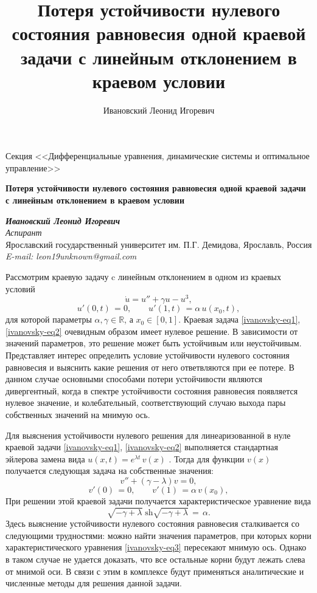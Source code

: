 \documentclass[a4paper, 12pt, oneside]{ncc}
\title{ Потеря устойчивости нулевого состояния равновесия одной краевой задачи с линейным отклонением в краевом условии }
\author{ Ивановский Леонид Игоревич }
\begin{document}
\begin{flushright}
Секция <<Дифференциальные уравнения, динамические системы и оптимальное управление>>
\end{flushright}

\begin{center}
\textbf{Потеря устойчивости нулевого состояния равновесия одной краевой задачи с линейным отклонением в краевом условии}
\end{center}


\begin{center}
\textbf{\textit{Ивановский Леонид Игоревич}}\\
\textit{Аспирант}\\
Ярославский государственный университет им. П.Г. Демидова, Ярославль, Россия\\
\textit{E-mail: leon19unknown@gmail.com}
\\
\end{center}


Рассмотрим краевую задачу c линейным отклонением в одном из краевых условий
\begin{equation}\label{ivanovsky-eq1}
	\dot u = u'' + \gamma u - u^3,	
\end{equation}
\begin{equation}\label{ivanovsky-eq2}	
	u'(0, t) \, = 0, \qquad u'(1, t) \, = \alpha\,u(x_0, t),
\end{equation}
для которой параметры $ \alpha, \gamma \in \mathbb{R} $, а $ x_0 \in [0,1] $. Краевая задача \eqref{ivanovsky-eq1}, \eqref{ivanovsky-eq2} очевидным образом имеет нулевое решение. В зависимости от значений параметров, это решение может быть устойчивым или неустойчивым. Представляет интерес определить условие устойчивости нулевого состояния равновесия и выяснить какие решения от него ответвляются при ее потере. В данном случае основными способами потери устойчивости являются дивергентный, когда в спектре устойчивости состояния равновесия появляется нулевое значение, и колебательный, соответствующий случаю выхода пары собственных значений  на мнимую ось.

Для выяснения устойчивости нулевого решения для линеаризованной в нуле краевой задачи \eqref{ivanovsky-eq1}, \eqref{ivanovsky-eq2} выполняется стандартная эйлерова замена вида $ u(x, t) = e^{\lambda t} \, v(x) $ . Тогда для функции $ v(x) $ получается следующая задача на собственные значения:
$$ v'' + (\gamma - \lambda)v = 0, $$
$$ v'(0) \, = 0, \qquad v'(1) \, = \alpha\,v(x_0), $$
При решении этой краевой задачи получается характеристическое уравнение вида
\begin{equation}\label{ivanovsky-eq3}
	\sqrt{-\gamma + \lambda} \; \mbox{sh} \sqrt{-\gamma + \lambda} \, = \, \alpha. 
\end{equation}
Здесь выяснение устойчивости нулевого состояния равновесия сталкивается со следующими трудностями: можно найти значения параметров, при которых корни характеристического уравнения \eqref{ivanovsky-eq3} пересекают мнимую ось. Однако в таком случае не удается доказать, что все остальные корни будут лежать слева от мнимой оси. В связи с этим в комплексе будут применяться аналитические и численные методы для решения данной задачи.
\end{document}
